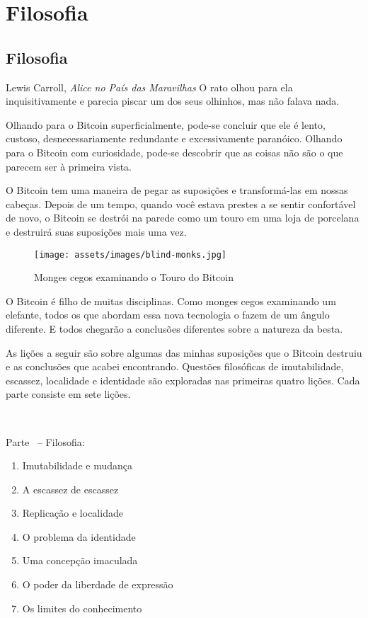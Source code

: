 \part{Filosofia}
\label{ch:philosophy}
\chapter*{Filosofia}

\begin{chapquote}{Lewis Carroll, \textit{Alice no País das Maravilhas}}
O rato olhou para ela inquisitivamente e parecia piscar um dos seus olhinhos, mas não falava nada.
\end{chapquote}

Olhando para o Bitcoin superficialmente, pode-se concluir que ele é lento, custoso, desnecessariamente redundante e excessivamente paranóico. Olhando para o Bitcoin com curiosidade, pode-se descobrir que as coisas não são o que parecem ser à primeira vista.

O Bitcoin tem uma maneira de pegar as suposições e transformá-las em nossas cabeças. Depois de um tempo, quando você estava prestes a se sentir confortável de novo, o Bitcoin se destrói na parede como um touro em uma loja de porcelana e destruirá suas suposições mais uma vez.

\begin{figure}
  \texttt{[image: assets/images/blind-monks.jpg]}
  \caption{Monges cegos examinando o Touro do Bitcoin}
  \label{fig:blind-monks}
\end{figure}

O Bitcoin é filho de muitas disciplinas. Como monges cegos examinando um elefante, todos os que abordam essa nova tecnologia o fazem de um ângulo diferente. E todos chegarão a conclusões diferentes sobre a natureza da besta.

As lições a seguir são sobre algumas das minhas suposições que o Bitcoin destruiu e as conclusões que acabei encontrando. Questões filosóficas de imutabilidade, escassez, localidade e identidade são exploradas nas primeiras quatro lições. Cada parte consiste em sete lições.

~

\begin{samepage}
Parte~\ref{ch:philosophy} -- Filosofia:

\begin{enumerate}
  \item Imutabilidade e mudança
  \item A escassez de escassez
  \item Replicação e localidade
  \item O problema da identidade
  \item Uma concepção imaculada
  \item O poder da liberdade de expressão
  \item Os limites do conhecimento
\end{enumerate}
\end{samepage}

